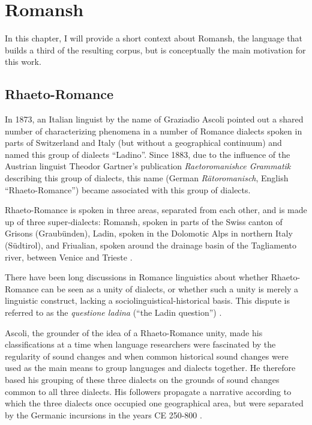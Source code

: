 \chapter{Romansh}\label{chap:romansh}

In this chapter, I will provide a short context about Romansh, the language that builds a third of the resulting corpus, but is conceptually the main motivation for this work.

\section{Rhaeto-Romance}
In 1873, an Italian linguist by the name of Graziadio Ascoli pointed out a shared number of characterizing phenomena in a number of Romance dialects spoken in parts of Switzerland and Italy (but without a geographical continuum) and named this group of dialects \enquote{Ladino}. Since 1883, due to the influence of the Austrian linguist Theodor Gartner's publication \emph{Raetoromanishce Grammatik} describing this group of dialects, this name (German \emph{Rätoromanisch}, English \enquote{Rhaeto-Romance}) became associated with this group of dialects. 

Rhaeto-Romance is spoken in three areas, separated from each other, and is made up of three super-dialects: Romansh, spoken in parts of the Swiss canton of Grisons (Graubünden), Ladin, spoken in the Dolomotic Alps in northern Italy (Südtirol), and Friualian, spoken around the drainage basin of the Tagliamento river, between Venice and Trieste \autocite[1]{haiman1992}.

There have been long discussions in Romance linguistics about whether Rhaeto-Romance can be seen as a unity of dialects, or whether such a unity is merely a linguistic construct, lacking a sociolinguistical-historical basis. 
This dispute is referred to as the \emph{questione ladina} (\enquote{the Ladin question}) \autocite{liver1999}. 

Ascoli, the grounder of the idea of a Rhaeto-Romance unity, made his classifications at a time when language researchers were fascinated by the regularity of sound changes and when common historical sound changes were used as the main means to group languages and dialects together. He therefore based his grouping of these three dialects on the grounds of sound changes common to all three dialects. 
His followers propagate a narrative according to which the three dialects once occupied one geographical area, but were separated by the Germanic incursions in the years CE 250-800 \autocites[174]{bossong2008}[11]{haiman1992}.


